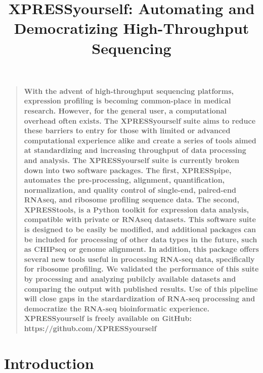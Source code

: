 \documentclass[11pt, a4paper, oneside]{article}
\title{
XPRESSyourself: Automating and Democratizing High-Throughput Sequencing
}
\date{}
\newenvironment{sciabstract}{%
\begin{quote} \bf}
{\end{quote}}
\begin{document}
\baselineskip24pt

\maketitle



\begin{sciabstract}
With the advent of high-throughput sequencing platforms, expression profiling is becoming common-place in medical research. However, for the general user, a computational overhead often exists. The XPRESSyourself suite aims to reduce these barriers to entry for those with limited or advanced computational experience alike and create a series of tools aimed at standardizing and increasing throughput of data processing and analysis. The XPRESSyourself suite is currently broken down into two software packages. The first, XPRESSpipe, automates the pre-processing, alignment, quantification, normalization, and quality control of single-end, paired-end RNAseq, and ribosome profiling sequence data. The second, XPRESStools, is a Python toolkit for expression data analysis, compatible with private or RNAseq datasets. This software suite is designed to be easily be modified, and additional packages can be included for processing of other data types in the future, such as CHIPseq or genome alignment. In addition, this package offers several new tools useful in processing RNA-seq data, specifically for ribosome profiling. We validated the performance of this suite by processing and analyzing pubilcly available datasets and comparing the output with published results. Use of this pipeline will close gaps in the stardardization of RNA-seq processing and democratize the RNA-seq bioinformatic experience.
\newline\\
\normalfont XPRESSyourself is freely available on GitHub: https://github.com/XPRESSyourself\\
\end{sciabstract}


\section{Introduction}
\end{document}
